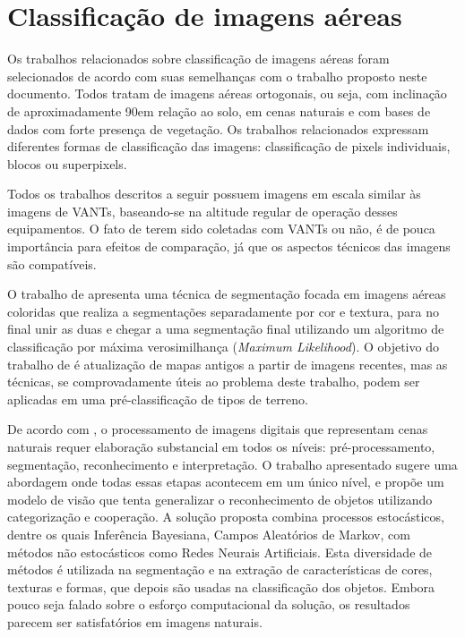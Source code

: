 
\section{Classificação de imagens aéreas}

Os trabalhos relacionados sobre classificação de imagens aéreas foram selecionados de acordo com suas semelhanças com o trabalho proposto neste documento. Todos tratam de imagens aéreas ortogonais, ou seja, com inclinação de aproximadamente 90\degree em relação ao solo, em cenas naturais e com bases de dados com forte presença de vegetação. Os trabalhos relacionados expressam diferentes formas de classificação das imagens: classificação de pixels individuais, blocos ou superpixels.

Todos os trabalhos descritos a seguir possuem imagens em escala similar às imagens de VANTs, baseando-se na altitude regular de operação desses equipamentos. O fato de terem sido coletadas com VANTs ou não, é de pouca importância para efeitos de comparação, já que os aspectos técnicos das imagens são compatíveis.

O trabalho de  apresenta uma técnica de segmentação focada em imagens aéreas coloridas que realiza a segmentações separadamente por cor e textura, para no final unir as duas e chegar a uma segmentação final utilizando um algoritmo de classificação por máxima verosimilhança (\textit{Maximum Likelihood}). O objetivo do trabalho de  é atualização de mapas antigos a partir de imagens recentes, mas as técnicas, se comprovadamente úteis ao problema deste trabalho, podem ser aplicadas em uma pré-classificação de tipos de terreno.

De acordo com , o processamento de imagens digitais que representam cenas naturais requer elaboração substancial em todos os níveis: pré-processamento, segmentação, reconhecimento e interpretação. O trabalho apresentado sugere uma abordagem onde todas essas etapas acontecem em um único nível, e propõe um modelo de visão que tenta generalizar o reconhecimento de objetos utilizando categorização e cooperação.  A solução proposta combina processos estocásticos, dentre os quais Inferência Bayesiana, Campos Aleatórios de Markov, com métodos não estocásticos como Redes Neurais Artificiais. Esta diversidade de métodos é utilizada na segmentação e na extração de características de cores, texturas e formas, que depois são usadas na classificação dos objetos. Embora pouco seja falado sobre o esforço computacional da solução, os resultados parecem ser satisfatórios em imagens naturais.

